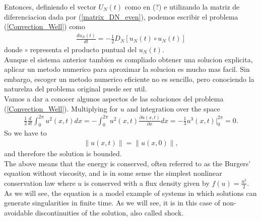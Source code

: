 		Entonces, definiendo el vector $U_N (t)$ como en (?) e utilizando la matriz de diferenciacion dada por (\ref{matrix_DN_even}), podemos escribir el problema (\ref{Convection_Well}) como
		\begin{align*}
			\frac{d u_N (t)}{dt} = - \frac{1}{2} D_N \left[ u_N (t) \circ u_N (t) \right]
		\end{align*}
		donde $\circ$ representa el producto puntual del $u_N (t)$. \\
		
		Aunque el sistema anterior tambien es compliado obtener una solucion explicita, aplicar un metodo numerico para aproximar la solucion es mucho mas facil. Sin embargo, escoger un metodo numerico eficiente no es sencillo, pero conociendo la naturelza del problema original puede ser util. \\ 
		
		Vamos a dar a conocer algunos aspectos de las soluciones del problema (\ref{Convection_Well}). Multiplying for $u$ and integration over the space
		\begin{align*}
			\frac{1}{2} \frac{d}{dt} \displaystyle \int_{0}^{2 \pi} u^2(x, t) dx = - \int_{0}^{2 \pi} u^2(x, t) \frac{\partial u(x, t)}{\partial x} dx = - \frac{1}{3} u^3(x, t) \Big|^{2 \pi}_{0} = 0.
		\end{align*}
		So we have to
		\begin{align*}
			\| u(x, t) \| = \| u(x, 0) \|,  
		\end{align*}
		and therefore the solution is bounded. \\
		
		The above means that the energy is conserved, often referred to as the Burgers' equation without viscosity, and is in some sense the simplest nonlinear conservation law  where $u$ is conserved with a flux density given by $f(u) = \frac{u^2}{2}$.\\
		
		As we will see, the equation is a model example of systems in which solutions can generate singularities in finite time. As we will see, it is in this case of non-avoidable discontinuities of the solution, also called shock. \\
		

